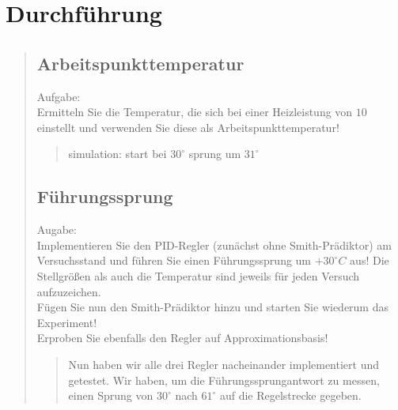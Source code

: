 \section{Durchführung}
\begin{quote}
    
    
    \subsection{Arbeitspunkttemperatur}
    \begin{quote}
        
    \end{quote}
    Aufgabe:\\
    Ermitteln Sie die Temperatur, die sich bei einer Heizleistung von $10$ einstellt und verwenden Sie diese als
    Arbeitspunkttemperatur!\vspace{1em}
    
    \begin{quote}
        simulation: start bei $30^{\circ}$ sprung um $31^{\circ}$
    \end{quote}
    
    
    
    \subsection{Führungssprung}
    
    Augabe:\\
    Implementieren Sie den PID-Regler (zunächst ohne Smith-Prädiktor) am Versuchsstand und führen Sie einen
    Führungssprung um $+30^{\circ} C$ aus! Die Stellgrößen als auch die Temperatur sind jeweils für jeden Versuch
    aufzuzeichen.\\
    Fügen Sie nun den Smith-Prädiktor hinzu und starten Sie wiederum das Experiment!\\
    Erproben Sie ebenfalls den Regler auf Approximationsbasis!\vspace{1em}
    
    
    
    \begin{quote}
        Nun haben wir alle drei Regler nacheinander implementiert und getestet. Wir haben, um die Führungssprungantwort zu
        messen, einen Sprung von $30^{\circ}$ nach $61^{\circ}$ auf die Regelstrecke gegeben.
        

\end{quote}
\end{quote}
